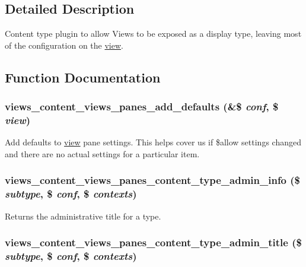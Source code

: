 \subsection{Detailed Description}
Content type plugin to allow Views to be exposed as a display type, leaving most of the configuration on the \hyperlink{classview}{view}. 

\subsection{Function Documentation}
\hypertarget{views__panes_8inc_a8c66441e03f6ca1eb97b2ff4eda629b1}{
\subsubsection[{views\_\-content\_\-views\_\-panes\_\-add\_\-defaults}]{\setlength{\rightskip}{0pt plus 5cm}views\_\-content\_\-views\_\-panes\_\-add\_\-defaults (\&\$ {\em conf}, \/  \$ {\em view})}}
\label{views__panes_8inc_a8c66441e03f6ca1eb97b2ff4eda629b1}
Add defaults to \hyperlink{classview}{view} pane settings. This helps cover us if \$allow settings changed and there are no actual settings for a particular item. \hypertarget{views__panes_8inc_a195ec7b84cf3cbca102ed50bf78949d7}{
\subsubsection[{views\_\-content\_\-views\_\-panes\_\-content\_\-type\_\-admin\_\-info}]{\setlength{\rightskip}{0pt plus 5cm}views\_\-content\_\-views\_\-panes\_\-content\_\-type\_\-admin\_\-info (\$ {\em subtype}, \/  \$ {\em conf}, \/  \$ {\em contexts})}}
\label{views__panes_8inc_a195ec7b84cf3cbca102ed50bf78949d7}
Returns the administrative title for a type. \hypertarget{views__panes_8inc_a9f812dd75c492c5947dcb4409d2b1651}{
\subsubsection[{views\_\-content\_\-views\_\-panes\_\-content\_\-type\_\-admin\_\-title}]{\setlength{\rightskip}{0pt plus 5cm}views\_\-content\_\-views\_\-panes\_\-content\_\-type\_\-admin\_\-title (\$ {\em subtype}, \/  \$ {\em conf}, \/  \$ {\em contexts})}}
